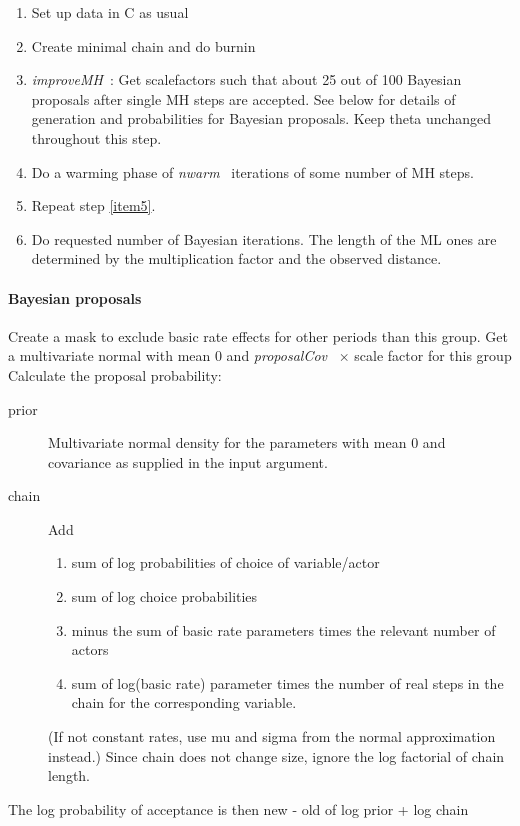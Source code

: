 \documentclass[a4paper,12pt,fleqn]{article}
\newcommand{\nnm}[1]{\textsf{\small\textit{#1}\ }}
\begin{document}
\begin{enumerate}
  \item Set up data in C as usual
  \item Create minimal chain and do burnin
  \item \nnm{improveMH}: Get scalefactors such that about 25 out of 100
  Bayesian proposals after single MH steps are accepted.
  See below for details of
      generation and probabilities for Bayesian proposals. Keep theta
      unchanged throughout this step. \label{item5}
\item Do a warming phase of \nnm{nwarm} iterations of some number of MH steps.
\item Repeat step \ref{item5}.
\item Do requested number of Bayesian iterations. The
  length of the ML ones are determined by the multiplication factor and the
  observed distance.
\end{enumerate}
\paragraph{Bayesian proposals}
\label{sec:prop}
\begin{algorithmic}
\STATE Create a mask to exclude basic rate effects for other periods than this
group.
\STATE Get a multivariate normal with mean 0 and  \nnm{proposalCov}
 $\times$ scale factor for this group
\STATE Calculate the proposal probability:
\begin{description}
\item[prior] Multivariate normal density for the parameters with mean 0
  and covariance as supplied in the input argument.
\item[chain] Add
\begin{enumerate}
\item sum of log probabilities of choice of variable/actor
\item sum of log choice probabilities
\item minus the sum of basic rate parameters times the
relevant number of actors
\item sum of log(basic rate) parameter times the
number of real steps in the chain for the corresponding variable.
\end{enumerate}
(If not constant rates, use mu and sigma from the normal approximation instead.)
Since chain does not change size, ignore the log factorial of chain length.
\end{description}
\STATE The log probability of acceptance is then new - old  of log prior +
log chain
\ENDFOR
\end{algorithmic}
\end{document}
